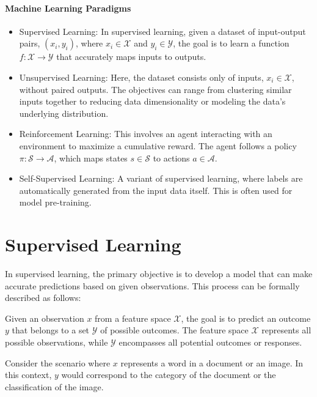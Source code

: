 \documentclass[11pt]{article}
\begin{document}
    \paragraph{Machine Learning Paradigms}
    \begin{itemize}
        \item Supervised Learning:
        In supervised learning, given a dataset of input-output pairs, $(x_i, y_i)$, where $x_i \in \mathcal{X}$ and $y_i \in \mathcal{Y}$, the goal is to learn a function $f: \mathcal{X} \rightarrow \mathcal{Y}$ that accurately maps inputs to outputs.

        \item Unsupervised Learning:
        Here, the dataset consists only of inputs, $x_i \in \mathcal{X}$, without paired outputs. The objectives can range from clustering similar inputs together to reducing data dimensionality or modeling the data's underlying distribution.

        \item Reinforcement Learning:
        This involves an agent interacting with an environment to maximize a cumulative reward. The agent follows a policy $\pi: \mathcal{S} \rightarrow \mathcal{A}$, which maps states $s \in \mathcal{S}$ to actions $a \in \mathcal{A}$.

        \item Self-Supervised Learning:
        A variant of supervised learning, where labels are automatically generated from the input data itself. This is often used for model pre-training.
    \end{itemize}


    \section{Supervised Learning}

    In supervised learning, the primary objective is to develop a model that can make accurate predictions based on given observations. This process can be formally described as follows:

    Given an observation $x$ from a feature space $\mathcal{X}$, the goal is to predict an outcome $y$ that belongs to a set $\mathcal{Y}$ of possible outcomes. The feature space $\mathcal{X}$ represents all possible observations, while $\mathcal{Y}$ encompasses all potential outcomes or responses.

    \begin{example}
        Consider the scenario where $x$ represents a word in a document or an image. In this context, $y$ would correspond to the category of the document or the classification of the image.
    \end{example}
\end{document}
